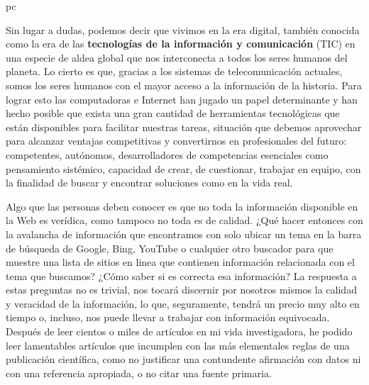 pc\documentclass[a4paper,12pt,openany]{book}
\begin{document}
Sin lugar a dudas, podemos decir que vivimos en la era digital, también conocida como la era de las \textbf{tecnologías de la información y comunicación} (TIC) en una especie de aldea global que nos interconecta a todos los seres humanos del planeta. Lo cierto es que, gracias a los sistemas de telecomunicación actuales, somos los seres humanos con el mayor acceso a la información de la historia. Para lograr esto las computadoras e Internet han jugado un papel determinante y han hecho posible que exista una gran cantidad de herramientas tecnológicas que están disponibles para facilitar nuestras tareas, situación que debemos aprovechar para alcanzar ventajas competitivas y convertirnos en profesionales del futuro: competentes, autónomos, desarrolladores de competencias esenciales como pensamiento sistémico, capacidad de crear, de cuestionar, trabajar en equipo, con la finalidad de buscar y encontrar soluciones como en la vida real.

Algo que las personas deben conocer es que no toda la información disponible en la Web es verídica, como tampoco no toda es de calidad. ¿Qué hacer entonces con la avalancha de información que encontramos con solo ubicar un tema en la barra de búsqueda de Google, Bing, YouTube o cualquier otro buscador para que muestre una lista de sitios en linea que contienen información relacionada con el tema que buscamos? ¿Cómo saber si es correcta esa información? La respuesta a estas preguntas no es trivial, nos tocará discernir por nosotros mismos la calidad y veracidad de la información, lo que, seguramente, tendrá un precio muy alto en tiempo o, incluso, nos puede llevar a trabajar con información equivocada. Después de leer cientos o miles de artículos en mi vida investigadora, he podido leer lamentables artículos que incumplen con las más elementales reglas de una publicación científica, como no justificar una contundente afirmación con datos ni con una referencia apropiada, o no citar una fuente primaria.
\end{document}
